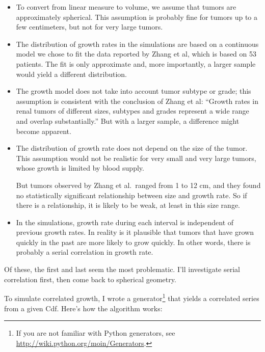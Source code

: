 \documentclass[12pt]{book}
\begin{document}
\begin{itemize}

\item To convert from linear measure to volume, we assume that
  tumors are approximately spherical.  This assumption is probably
  fine for tumors up to a few centimeters, but not for very
  large tumors.

\item The distribution of growth rates in the simulations are based on
  a continuous model we chose to fit the data reported by Zhang et al,
  which is based on 53 patients.  The fit is only approximate and, more
  importantly, a larger sample would yield a
  different distribution.

\item The growth model does not take into account tumor subtype or
  grade; this assumption is consistent with the conclusion of Zhang et al:
  ``Growth rates in renal tumors of different sizes, subtypes and
  grades represent a wide range and overlap substantially.''
  But with a larger sample, a difference might become apparent.

\item The distribution of growth rate does not depend on the size of
  the tumor.  This assumption would not be realistic for very
  small and very large tumors, whose growth is limited by blood supply.

  But tumors observed by Zhang et al.~ranged from 1 to 12 cm, and they
  found no statistically significant relationship between
  size and growth rate.  So if there is a relationship, it is
  likely to be weak, at least in this size range.
  
\item In the simulations, growth rate during each interval is
  independent of previous growth rates.  In reality is it plausible
  that tumors that have grown quickly in the past are more likely
  to grow quickly.  In other words, there is probably
  a serial correlation in growth rate.

\end{itemize}

Of these, the first and last seem the most problematic.  I'll
investigate serial correlation first, then come back to
spherical geometry.

To simulate correlated growth, I wrote a generator\footnote{If you are
  not familiar with Python generators, see
  \url{http://wiki.python.org/moin/Generators}.} that yields a
correlated series from a given Cdf.  Here's how the algorithm works:
\end{document}
